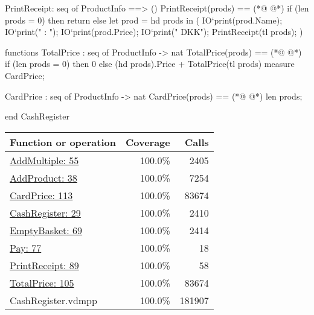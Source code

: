 \begin{vdmpp}
 PrintReceipt: seq of ProductInfo ==> ()
 PrintReceipt(prods) ==
(*@
\label{PrintReceipt:89}
@*)
  if (len prods = 0) then
   return
  else
   let prod = hd prods
    in 
    (
     IO`print(prod.Name);
     IO`print(" : ");
     IO`print(prod.Price);
     IO`print(" DKK\n");
     PrintReceipt(tl prods);
    )
   
functions
 TotalPrice : seq of ProductInfo -> nat
 TotalPrice(prods) == 
(*@
\label{TotalPrice:105}
@*)
  if (len prods = 0) then
   0
  else
   (hd prods).Price + TotalPrice(tl prods)
  measure CardPrice;
  
 CardPrice : seq of ProductInfo -> nat
 CardPrice(prods) ==
(*@
\label{CardPrice:113}
@*)
  len prods; 
  
end CashRegister
\end{vdmpp}
\bigskip
\begin{longtable}{|l|r|r|}
\hline
Function or operation & Coverage & Calls \\
\hline
\hline
\hyperref[AddMultiple:55]{AddMultiple: 55} & 100.0\% & 2405 \\
\hline
\hyperref[AddProduct:38]{AddProduct: 38} & 100.0\% & 7254 \\
\hline
\hyperref[CardPrice:113]{CardPrice: 113} & 100.0\% & 83674 \\
\hline
\hyperref[CashRegister:29]{CashRegister: 29} & 100.0\% & 2410 \\
\hline
\hyperref[EmptyBasket:69]{EmptyBasket: 69} & 100.0\% & 2414 \\
\hline
\hyperref[Pay:77]{Pay: 77} & 100.0\% & 18 \\
\hline
\hyperref[PrintReceipt:89]{PrintReceipt: 89} & 100.0\% & 58 \\
\hline
\hyperref[TotalPrice:105]{TotalPrice: 105} & 100.0\% & 83674 \\
\hline
\hline
CashRegister.vdmpp & 100.0\% & 181907 \\
\hline
\end{longtable}

